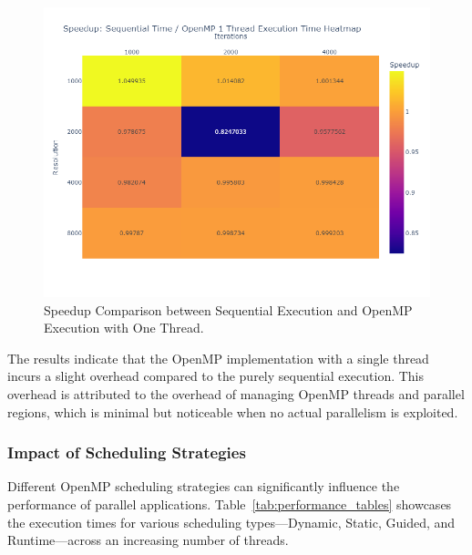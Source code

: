 \documentclass[
	report, %
	11pt, %
]{CSUniSchoolLabReport}
\newcounter{ct}
\begin{document}
\begin{figure}[H]
	\centering
	\includegraphics[width=\textwidth]{./img/mandelbrot_openmp_1_thread_speedup_heatmap.png}
	\caption{Speedup Comparison between Sequential Execution and OpenMP Execution with One Thread.}
	\label{fig:mandelbrot_openMP_1_thread_speedup}
\end{figure}

The results indicate that the OpenMP implementation with a single thread incurs a slight overhead compared to the purely sequential execution. This overhead is attributed to the overhead of managing OpenMP threads and parallel regions, which is minimal but noticeable when no actual parallelism is exploited.

\subsubsection{Impact of Scheduling Strategies}

Different OpenMP scheduling strategies can significantly influence the performance of parallel applications. Table~\ref{tab:performance_tables} showcases the execution times for various scheduling types—Dynamic, Static, Guided, and Runtime—across an increasing number of threads.
\end{document}
